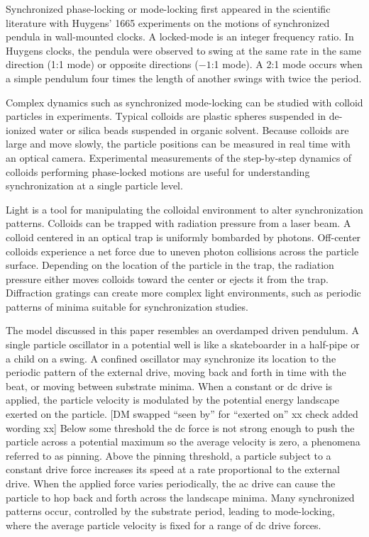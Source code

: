 \documentclass[preprint,showpacs,preprintnumbers,amsmath,amssymb,aps,prb]{revtex4-1}
\theoremstyle{remark}
\begin{document}
Synchronized phase-locking or mode-locking 
first appeared in the scientific literature
with 
Huygens' 1665 experiments on the
motions of synchronized 
pendula in wall-mounted clocks.\cite{Bennett2002}
A locked-mode is an integer frequency ratio.
In Huygens clocks,
the pendula were observed to swing at the  same rate
in the same direction (1:1 mode) or
opposite directions ($-1$:1 mode).
A 2:1 mode occurs when a simple pendulum four
times the length of another swings with twice the period.

Complex dynamics such as synchronized mode-locking
can be studied with
colloid particles in experiments.
Typical colloids are   
plastic spheres suspended in
de-ionized water or silica beads suspended in organic solvent.
Because 
colloids are large 
and move slowly, the
particle positions 
can be measured in real time 
with an optical camera.\cite{Pertsinidis2001}
Experimental measurements of the
step-by-step dynamics of 
colloids performing phase-locked motions
are useful for
understanding synchronization at a single particle level.\cite{Juniper2015,Juniper2017}

Light is a
tool for manipulating the colloidal environment
to alter synchronization patterns.
Colloids can be trapped
with 
radiation pressure from 
a laser beam.\cite{Ashkin1997}
A colloid centered in an optical trap is 
uniformly bombarded by photons. 
Off-center colloids 
experience a net force
due to uneven photon collisions across
the particle surface.
Depending on the 
location of the particle in the trap,
the radiation pressure either moves colloids toward the center 
or ejects it from the trap.
Diffraction gratings can create
more complex light environments, 
such as periodic patterns of minima
suitable for synchronization studies.\cite{Grier2003}

The model discussed in this paper
resembles an overdamped driven pendulum.
A single particle oscillator
in a potential well is 
like a skateboarder in a half-pipe or
a child on a swing.
A confined oscillator may 
synchronize its location
to the periodic pattern of the external drive,
moving back and forth in time with
the beat,
or moving between substrate minima.
When 
a constant or 
dc drive is applied,
the particle velocity is modulated by 
the potential energy landscape exerted on the particle.  %
[DM swapped ``seen by'' for ``exerted on'' xx check added wording xx] 
Below some threshold  
the dc force is not strong enough to push the particle
across a potential maximum so the average velocity is zero,
a phenomena referred to as pinning.\cite{Reichhardt2017}
Above the pinning threshold,
a particle subject to a constant
drive force  increases its speed at a rate proportional
to the external drive.  
When the applied force varies periodically,
the ac drive can 
cause the particle to hop back and forth across
the landscape minima.
Many synchronized patterns occur,
controlled by the substrate period,
leading to 
mode-locking,
where the average particle velocity
is fixed for a range of dc drive forces.\cite{Reichhardt2015}
\end{document}
